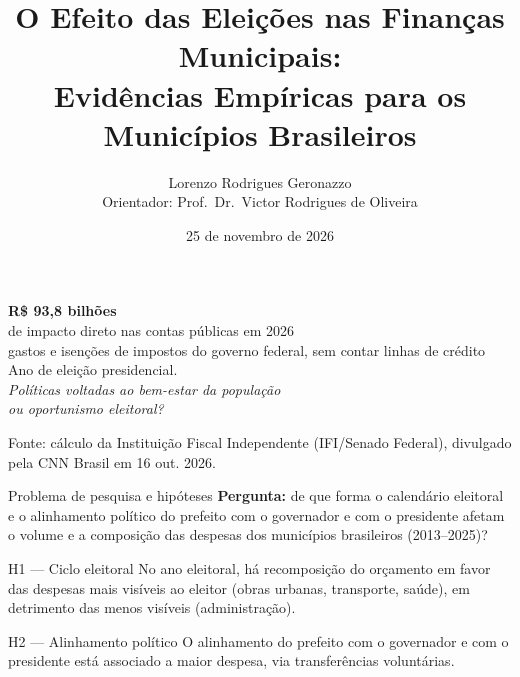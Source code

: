 \documentclass[aspectratio=169,9pt]{beamer}
\title[Eleições e finanças municipais]{O Efeito das Eleições nas Finanças Municipais:\\Evidências Empíricas para os Municípios Brasileiros}
\author[Lorenzo Rodrigues Geronazzo]{Lorenzo Rodrigues Geronazzo\texorpdfstring{\\[0.4em]}{, }{\small Orientador: Prof.~Dr.~Victor Rodrigues de Oliveira}}
\institute{Universidade Federal do Paraná\\Curso de Ciências Econômicas}
\date{25 de novembro de 2026}
\begin{document}
\begin{frame}
  \titlepage
  
\end{frame}

\begin{frame}[plain]
  \vfill
  \begin{center}
    {\Huge \textbf{R\$ 93,8 bilhões}}\\[1em]
    {\Large de impacto direto nas contas públicas em 2026}\\[0.6em]
    {\normalsize gastos e isenções de impostos do governo federal, sem contar linhas de crédito}\\[1.5em]
    {\large Ano de eleição presidencial.}\\[1.5em]
    {\Large \textit{Políticas voltadas ao bem-estar da população\\ ou oportunismo eleitoral?}}
  \end{center}
  \vfill
  {\tiny Fonte: cálculo da Instituição Fiscal Independente (IFI/Senado Federal), divulgado pela CNN Brasil em 16 out. 2026.}
\end{frame}

\begin{frame}{Problema de pesquisa e hipóteses}
  \textbf{Pergunta:} de que forma o calendário eleitoral e o alinhamento político do prefeito com o governador e com o presidente afetam o \alert{volume} e a \alert{composição} das despesas dos municípios brasileiros (2013--2025)?
  \vspace{1em}
  \begin{block}{H1 --- Ciclo eleitoral}
    No ano eleitoral, há recomposição do orçamento em favor das despesas mais visíveis ao eleitor (obras urbanas, transporte, saúde), em detrimento das menos visíveis (administração).
  \end{block}
  \begin{block}{H2 --- Alinhamento político}
    O alinhamento do prefeito com o governador e com o presidente está associado a maior despesa, via transferências voluntárias.
  \end{block}
\end{frame}
\end{document}
